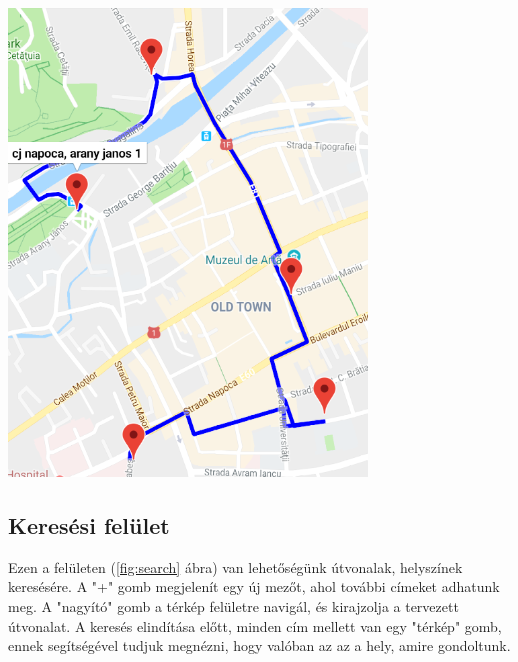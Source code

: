 \begin{minipage}{\linewidth}
\begin{multicols}{2}
	\setlength{\abovecaptionskip}{10pt}
		\begin{Figure}
			\includegraphics[width=\linewidth]{images/route}
		\end{Figure}
	\end{multicols}
\end{minipage}

\subsection{Keresési felület}

Ezen a felületen (\ref{fig:search} ábra) van lehetőségünk útvonalak, helyszínek keresésére. A "+" gomb megjelenít egy új mezőt, ahol további címeket adhatunk meg. A "nagyító" gomb a térkép felületre navigál, és kirajzolja a tervezett útvonalat. A keresés elindítása előtt, minden cím mellett van egy "térkép" gomb, ennek segítségével tudjuk megnézni, hogy valóban az az a hely, amire gondoltunk.

